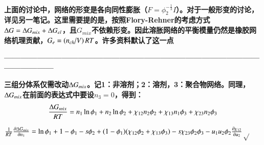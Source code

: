 \documentclass{article} %
\begin{document}
\noindent 
{\bf 上面的讨论中，网络的形变是各向同性膨胀（$F=\phi _{2}^{-\frac{1}{3} } I$）。对于一般形变的讨论，详见另一笔记。这里需要提的是，按照Flory-Rehner的考虑方式${\rm \Delta }G={\rm \Delta }G_{mix} +{\rm \Delta }G_{el} $，且$G_{mix} $不依赖形变。因此溶胀网络的平衡模量仍然是橡胶网络机理贡献，$G_{e} =\left({n_{ch} \mathord{\left/ {\vphantom {n_{ch}  V}} \right. \kern-\nulldelimiterspace} V} \right)RT$。许多资料默认了这一点}

\noindent 
{\bf ---------------------------------------------------------------------------------------------------------------}

\noindent 
{\bf 三组分体系仅需改动${\rm \Delta }G_{mix} $。记1：非溶剂；2：溶剂，3：聚合物网络。同理，${\rm \Delta }G_{mix} $在前面的表达式中要设$n_{3} =0$，得到：
\[\frac{{\rm \Delta }G_{mix} }{RT} =n_{1} \ln \phi _{1} +n_{2} \ln \phi _{2} +\chi _{12} n_{2} \phi _{2} +\chi _{13} n_{1} \phi _{3} +\chi _{23} n_{2} \phi _{3} \] }

{\bf $\frac{1}{RT} \frac{\partial {\rm \Delta }G_{mix} }{\partial n_{1} } =\ln \phi _{1} +1-\phi _{1} -s\phi _{2} +(1-\phi _{1} )(\chi _{12} \phi _{2} +\chi _{13} \phi _{3} )-s\chi _{23} \phi _{2} \phi _{3} -u_{1} u_{2} \phi _{2} \frac{\partial \chi _{12} }{\partial u_{2} } $$\mathrm{\sqrt{}}$}
\end{document}
